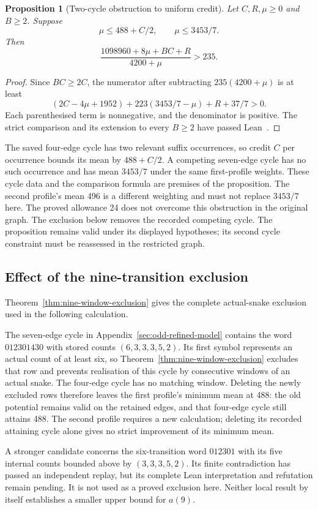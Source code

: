 \documentclass[11pt,a4paper]{article}
\newtheorem{proposition}[theorem]{Proposition}
\theoremstyle{definition}
\theoremstyle{remark}
\begin{document}
\begin{proposition}[Two-cycle obstruction to uniform credit]\label{prop:uniform-occurrence-credit}
Let $C,R,\mu\ge0$ and $B\ge2$. Suppose
\[
\mu\le488+C/2,\qquad \mu\le3453/7.
\]
Then
\[
\frac{1098960+8\mu+BC+R}{4200+\mu}>235.
\]
\end{proposition}
\begin{proof}
Since $BC\ge2C$, the numerator after subtracting $235(4200+\mu)$ is
at least
\[
(2C-4\mu+1952)+223(3453/7-\mu)+R+37/7>0.
\]
Each parenthesised term is nonnegative, and the denominator is positive.
The strict comparison and its extension to every $B\ge2$ have passed
Lean~\cite{lowpairarchive}.
\end{proof}
The saved four-edge cycle has two relevant suffix occurrences, so credit
$C$ per occurrence bounds its mean by $488+C/2$. A competing seven-edge
cycle has no such occurrence and has mean $3453/7$ under the same
first-profile weights. These cycle data and the comparison formula are
premises of the proposition. The second profile's mean 496 is a different
weighting and must not replace $3453/7$ here. The proved allowance 24 does not overcome this obstruction in the original
graph. The exclusion below removes the recorded competing cycle. The
proposition remains valid under its displayed hypotheses; its second cycle
constraint must be reassessed in the restricted graph.


\subsection{Effect of the nine-transition exclusion}
Theorem~\ref{thm:nine-window-exclusion} gives the complete actual-snake
exclusion used in the following calculation.

The seven-edge cycle in Appendix~\ref{sec:odd-refined-model} contains the
word $012301430$ with stored counts $(6,3,3,3,5,2)$. Its first symbol
represents an actual count of at least six, so Theorem~\ref{thm:nine-window-exclusion}
excludes that row and prevents realisation of this cycle by consecutive
windows of an actual snake. The four-edge cycle has no matching window.
Deleting the newly excluded rows therefore leaves the first profile's
minimum mean at 488: the old potential remains valid on the retained edges,
and that four-edge cycle still attains 488. The second profile requires a
new calculation; deleting its recorded attaining cycle alone gives no
strict improvement of its minimum mean.

A stronger candidate concerns the six-transition word $012301$ with its
five internal counts bounded above by $(3,3,3,5,2)$. Its finite contradiction
has passed an independent replay, but its complete Lean interpretation and
refutation remain pending. It is not used as a proved exclusion here.
Neither local result by itself establishes a smaller upper bound for $a(9)$.
\end{document}
